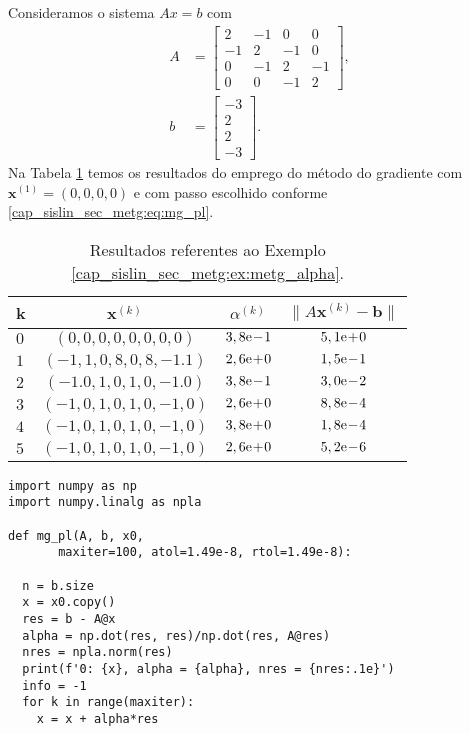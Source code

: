 \begin{ex}\label{ex:metg_alpha}
  Consideramos o sistema $Ax = b$ com
  \begin{align}
    A &=
    \begin{bmatrix}
      2 & -1 & 0 & 0\\
      -1 & 2 & -1 & 0\\
      0 & -1 & 2 & -1 \\
      0 & 0 & -1 & 2
    \end{bmatrix},\\
    b &=
    \begin{bmatrix}
      -3\\
      2\\
      2\\
      -3
    \end{bmatrix}.
  \end{align}
  Na Tabela \ref{cap_sislin_sec_metg:tab:metg_alpha} temos os resultados do emprego do método do gradiente com $\pmb{x}^{(1)} = (0, 0, 0, 0)$ e com passo escolhido conforme \eqref{cap_sislin_sec_metg:eq:mg_pl}.

  \begin{table}[H]
    \centering
    \caption{Resultados referentes ao Exemplo \ref{cap_sislin_sec_metg:ex:metg_alpha}.}
    \label{cap_sislin_sec_metg:tab:metg_alpha}
    \begin{tabular}{l|c|cc}
      k & $\pmb{x}^{(k)}$ & $\alpha^{(k)}$ & $\|A\pmb{x}^{(k)}-\pmb{b}\|$\\\hline
      $0$ & $(0,0, 0,0, 0,0, 0,0)$ & $3,8\mathrm{e}\!-\!1$ & $5,1\mathrm{e}\!+\!0$ \\
      $1$ & $(-1,1, 0,8, 0,8, -1.1)$ & $2,6\mathrm{e}\!+\!0$ & $1,5\mathrm{e}\!-\!1$ \\
      $2$ & $(-1.0, 1,0, 1,0, -1.0)$ & $3,8\mathrm{e}\!-\!1$ & $3,0\mathrm{e}\!-\!2$ \\
      $3$ & $(-1,0, 1,0, 1,0, -1,0)$ & $2,6\mathrm{e}\!+\!0$ & $8,8\mathrm{e}\!-\!4$ \\
      $4$ & $(-1,0, 1,0, 1,0, -1,0)$ & $3,8\mathrm{e}\!+\!0$ & $1,8\mathrm{e}\!-\!4$ \\
      $5$ & $(-1,0, 1,0, 1,0, -1,0)$ & $2,6\mathrm{e}\!+\!0$ & $5,2\mathrm{e}\!-\!6$ \\\hline
    \end{tabular}
  \end{table}

\begin{lstlisting}
import numpy as np
import numpy.linalg as npla

def mg_pl(A, b, x0,
       maxiter=100, atol=1.49e-8, rtol=1.49e-8):
    
  n = b.size
  x = x0.copy()
  res = b - A@x
  alpha = np.dot(res, res)/np.dot(res, A@res)
  nres = npla.norm(res)
  print(f'0: {x}, alpha = {alpha}, nres = {nres:.1e}')
  info = -1
  for k in range(maxiter):
    x = x + alpha*res
    

\end{lstlisting}
\end{ex}
